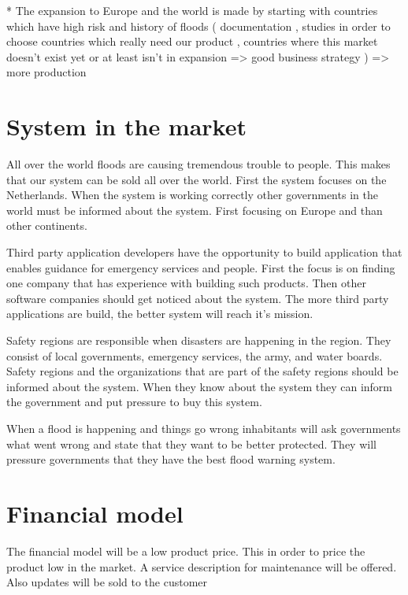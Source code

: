 * The expansion to Europe and the world is made by starting with countries which have high risk and history of floods ( documentation , studies in order to choose countries which really need our product , countries where this market doesn't exist yet or at least isn't in expansion => good business strategy ) => more production \\

\section{System in the market}
All over the world floods are causing tremendous trouble to people. This makes that our system can be sold all over the world. First the system focuses on the Netherlands. When the system is working correctly other governments in the world must be informed about the system. First focusing on Europe and than other continents.

Third party application developers have the opportunity to build application that enables guidance for emergency services and people. First the focus is on finding one company that has experience with building such products. Then other software companies should get noticed about the system. The more third party applications are build, the better system will reach it's mission.

Safety regions are responsible when disasters are happening in the region. They consist of local governments, emergency services, the army, and water boards. Safety regions and the organizations that are part of the safety regions should be informed about the system. When they know about the system they can inform the government and put pressure to buy this system.

When a flood is happening and things go wrong inhabitants will ask governments what went wrong and state that they want to be better protected. They will pressure governments that they have the best flood warning system.

\section{Financial model}
The financial model will be a low product price. This in order to price the product low in the market. A service description for maintenance will be offered. Also updates will be sold to the customer\\
